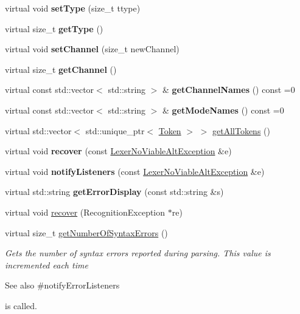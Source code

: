 \begin{DoxyCompactItemize}
virtual void {\bfseries set\+Type} (size\+\_\+t ttype)
\item 
\mbox{\label{classantlr4_1_1Lexer_ad294d5e5045a598c18dd17744792edcd}} 
virtual size\+\_\+t {\bfseries get\+Type} ()
\item 
\mbox{\label{classantlr4_1_1Lexer_a6478b16b66448d149cae041c222fe091}} 
virtual void {\bfseries set\+Channel} (size\+\_\+t new\+Channel)
\item 
\mbox{\label{classantlr4_1_1Lexer_a8a3bd76c7190fdd91072d96bec5fd244}} 
virtual size\+\_\+t {\bfseries get\+Channel} ()
\item 
\mbox{\label{classantlr4_1_1Lexer_aa6bf7c43478e74dc1ce7c14f529d43db}} 
virtual const std\+::vector$<$ std\+::string $>$ \& {\bfseries get\+Channel\+Names} () const =0
\item 
\mbox{\label{classantlr4_1_1Lexer_ad698b10577eca96cf9aefb5b355f58fd}} 
virtual const std\+::vector$<$ std\+::string $>$ \& {\bfseries get\+Mode\+Names} () const =0
\item 
virtual std\+::vector$<$ std\+::unique\+\_\+ptr$<$ \hyperlink{classantlr4_1_1Token}{Token} $>$ $>$ \hyperlink{classantlr4_1_1Lexer_a113a0f0bdb864c0137f173a6c441f363}{get\+All\+Tokens} ()
\item 
\mbox{\label{classantlr4_1_1Lexer_a880e12b38cf51ae23402c44eb974652e}} 
virtual void {\bfseries recover} (const \hyperlink{classantlr4_1_1LexerNoViableAltException}{Lexer\+No\+Viable\+Alt\+Exception} \&e)
\item 
\mbox{\label{classantlr4_1_1Lexer_a026e283b0d6977e70e9aff78ddc4928b}} 
virtual void {\bfseries notify\+Listeners} (const \hyperlink{classantlr4_1_1LexerNoViableAltException}{Lexer\+No\+Viable\+Alt\+Exception} \&e)
\item 
\mbox{\label{classantlr4_1_1Lexer_a2afa19ba71ddd0e16db9e05d71a6c84c}} 
virtual std\+::string {\bfseries get\+Error\+Display} (const std\+::string \&s)
\item 
virtual void \hyperlink{classantlr4_1_1Lexer_a10144d7c075e22abc60274f3e457bdb6}{recover} (Recognition\+Exception $\ast$re)
\item 
virtual size\+\_\+t \hyperlink{classantlr4_1_1Lexer_a409c001d60382ba3e0c3b9874978fc3e}{get\+Number\+Of\+Syntax\+Errors} ()
\begin{DoxyCompactList}\small\item\em Gets the number of syntax errors reported during parsing. This value is incremented each time \begin{DoxySeeAlso}{See also}
\#notify\+Error\+Listeners


\end{DoxySeeAlso}
is called. \end{DoxyCompactList}\end{DoxyCompactItemize}
